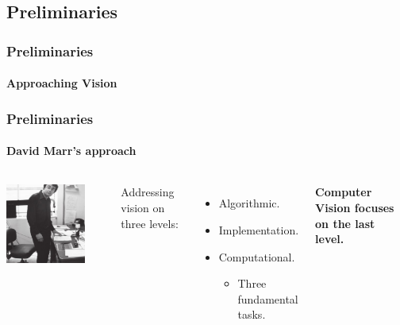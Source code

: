 \subsection*{Preliminaries}
\begin{frame}[t]
    \frametitle{Preliminaries}
    \framesubtitle{Approaching Vision}
    
\end{frame}
\begin{frame}[t]
    \frametitle{Preliminaries}
    \framesubtitle{David Marr's approach}
    \begin{columns}[t]
        \begin{center}
            \includegraphics[width=0.8\textwidth]{fig/rel/common/img/Marr.jpg}    
        \end{center}
        Addressing vision on three levels:
        \begin{itemize}
            \item Algorithmic.
            \item Implementation.
            \item Computational.
            \begin{itemize}
                \item Three fundamental tasks. \cite{malik2016three}
            \end{itemize}
        \end{itemize}
        \pause
        \vspace{20pt}
        \textbf{Computer Vision focuses on the last level.}
        
    \end{columns}
    
\end{frame}
